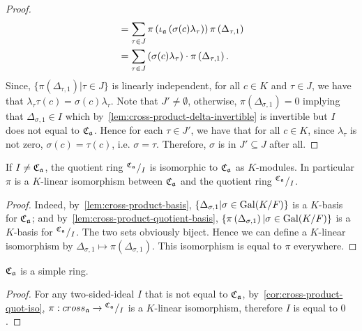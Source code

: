 \begin{proof}
\[\begin{aligned}
      &= \sum_{\tau\in J}
        \pi\left(\iota_{\mathfrak{a}}\left(\sigma(c)\lambda_{\tau}\right)\right)
        \pi\left(\Delta_{\tau, 1}\right) \\
      &= \sum_{\tau\in J}
        \left(\sigma(c)\lambda_{\tau}\right)\cdot \pi\left(\Delta_{\tau, 1}\right).
    \end{aligned}
  \]
  Since, $\{\pi\left(\Delta_{\tau, 1}\right) | \tau \in J\}$ is linearly independent, for all $c \in K$ and $\tau\in J$, we have that $\lambda_{\tau}\tau(c) = \sigma(c)\lambda_{\tau}$. Note that $J' \ne \emptyset$, otherwise, $\pi\left(\Delta_{\sigma, 1}\right) = 0$ implying that $\Delta_{\sigma, 1} \in I$ which by~\cref{lem:cross-product-delta-invertible} is invertible but $I$ does not equal to $\operatorname{\mathfrak{C}}_{\mathfrak{a}}$. Hence for each $\tau \in J'$, we have that for all $c \in K$, since $\lambda_{\tau}$ is not zero, $\sigma(c) = \tau(c)$, i.e. $\sigma = \tau$. Therefore, $\sigma$ is in $J' \subseteq J$ after all.
\end{proof}

\begin{corollary}\label{cor:cross-product-quot-iso}
  If $I \ne \operatorname{\mathfrak{C}}_{\mathfrak{a}}$, the quotient ring ${}^{\operatorname{\mathfrak{C}}_{\mathfrak{a}}}/_{I}$ is isomorphic to $\operatorname{\mathfrak{C}}_{\mathfrak{a}}$ as $K$-modules. In particular $\pi$ is a $K$-linear isomorphism between $\operatorname{\mathfrak{C}}_{\mathfrak{a}}$ and the quotient ring ${}^{\operatorname{\mathfrak{C}}_{\mathfrak{a}}}/_{I}$.
  \leanok
\end{corollary}

\begin{proof}
  Indeed, by~\cref{lem:cross-product-basis}, $\{\Delta_{\sigma, 1}|\sigma \in \operatorname{Gal}(K/F)\}$ is a $K$-basis for $\operatorname{\mathfrak{C}}_{\mathfrak{a}}$; and by~\cref{lem:cross-product-quotient-basis}, $\{\pi\left(\Delta_{\sigma, 1}\right) | \sigma\in\operatorname{Gal}(K/F)\}$ is a $K$-basis for ${}^{\operatorname{\mathfrak{C}}_{\mathfrak{a}}}/_{I}$. The two sets obviously biject. Hence we can define a $K$-linear isomorphism by $\Delta_{\sigma, 1} \mapsto \pi\left(\Delta_{\sigma, 1}\right)$. This isomorphism is equal to $\pi$ everywhere.
\end{proof}

\begin{corollary}\label{cor:cross-product-simple}
  $\operatorname{\mathfrak{C}}_{\mathfrak{a}}$ is a simple ring.
  \leanok
\end{corollary}

\begin{proof}
  For any two-sided-ideal $I$ that is not equal to $\operatorname{\mathfrak{C}}_{\mathfrak{a}}$, by~\cref{cor:cross-product-quot-iso}, $\pi : cross_{\mathfrak{a}} \to {}^{\operatorname{\mathfrak{C}}_{\mathfrak{a}}}/_{I}$ is a $K$-linear isomorphism, therefore $I$ is equal to $0$.
\end{proof}


